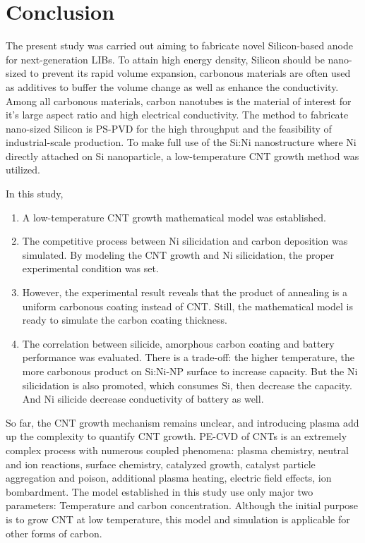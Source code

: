 \chapter{Conclusion}
The present study was carried out aiming to fabricate novel Silicon-based anode  for next-generation LIBs.  To attain high energy density, Silicon should be nano-sized to prevent its rapid volume expansion, carbonous materials are often used as additives to buffer the volume change as well as enhance the conductivity. Among all carbonous materials, carbon nanotubes is the material of interest for it’s large aspect ratio and high electrical conductivity. The method to fabricate nano-sized Silicon is PS-PVD for the high throughput and the feasibility of industrial-scale production. To make full use of the Si:Ni nanostructure where Ni directly attached on Si nanoparticle, a low-temperature CNT growth method was utilized. 

In this study,
\begin{enumerate}[(1)]
\item A low-temperature CNT growth mathematical model was established.
\item The competitive process between Ni silicidation and carbon deposition was simulated. By modeling the CNT growth and Ni silicidation, the proper experimental condition was set.
\item However, the experimental result reveals that the product of annealing is a uniform carbonous coating instead of CNT. Still, the mathematical model is ready to simulate the carbon coating thickness.
\item The correlation between silicide, amorphous carbon coating and battery performance was evaluated. There is a trade-off: the higher temperature, the more carbonous product on Si:Ni-NP surface to increase capacity. But the Ni silicidation is also promoted, which consumes Si, then decrease the capacity. And Ni silicide decrease conductivity of battery as well.
\end{enumerate}

So far, the CNT growth mechanism remains unclear,  and introducing plasma add up the complexity to quantify CNT growth. PE-CVD of CNTs is an extremely complex process with numerous coupled phenomena: plasma chemistry, neutral and ion reactions, surface chemistry, catalyzed growth, catalyst particle aggregation and poison, additional plasma heating, electric ﬁeld effects, ion bombardment. The model established in this study use only major two parameters: Temperature and carbon concentration. Although the initial purpose is to grow CNT at low temperature, this model and simulation is applicable for other forms of carbon. 
